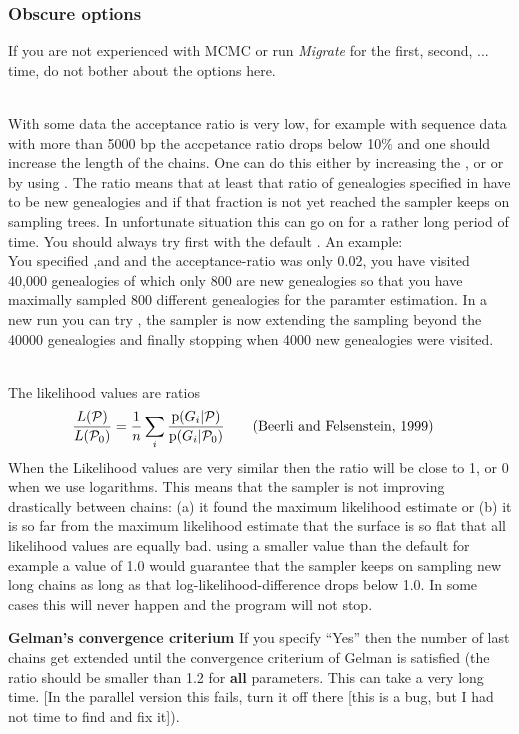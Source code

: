 \subsubsection{Obscure options}
If you are not experienced with MCMC or run \textit{ Migrate} for the first, 
second, ... time, do not bother about the options here.
\begin{description}
\item{}\\
With some data the acceptance ratio is very low, for example with 
sequence data with more than 5000 bp the accpetance ratio drops below 10\%
and one should increase the length of the chains. One can do this either by increasing the {}, or {} or by using
{}. The ratio means that at least that ratio of genealogies
specified in {} have to be  new genealogies and if that fraction
is not yet reached the sampler keeps on sampling trees. In unfortunate situation this can go on for a rather long period of time.
You should always try first with the default {}.
An example:\\
You specified {},and {} and the acceptance-ratio was only 0.02, you have visited 40,000 genealogies of which only 800 are new genealogies so that you have maximally sampled 800 different
genealogies for the paramter estimation.
In a new run you can try {}, the sampler is now extending the sampling beyond the 40000 genealogies and finally stopping when 4000 new genealogies were visited.

\item{}\\
The likelihood values are ratios
\begin{align}
\frac{L(\mathcal{P})}{L(\mathcal{P}_0)}&=\frac{1}{n} \sum_i\frac{{\mathrm p}(G_i | \mathcal{P})} {{\mathrm p}(G_i | \mathcal{P}_0)}\qquad\text{(Beerli and Felsenstein, 1999)}\nonumber
\end{align}
When the Likelihood values are very similar then the ratio will be close
to 1, or 0 when we use logarithms. This means that the sampler
is not improving drastically between chains: (a) it found the maximum likelihood estimate or (b) it is so far from the maximum likelihood estimate that the surface is so flat that all likelihood values are equally bad.
using a smaller value than the default {}
for example a value of 1.0 would guarantee that the sampler keeps on 
sampling new long chains as long as that log-likelihood-difference drops below 1.0. In some cases this will never happen and the program will not stop.
\item{ \textbf{Gelman's convergence criterium}} If you specify ``Yes'' then 
the number of last chains get extended until the convergence criterium
of Gelman is satisfied (the ratio should be smaller than 1.2 for \textbf{ all} parameters. This can take a very long time. [In the parallel version this fails, turn it off there [this is a bug, but I had not time to find and fix it]).
\end{description}

